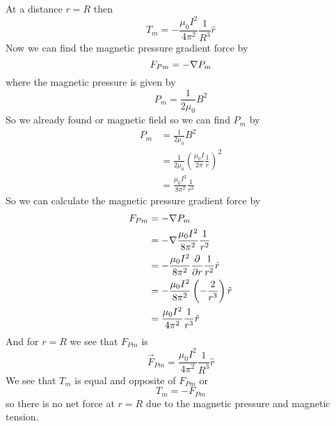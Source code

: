 \documentclass[11pt]{article}
\numberwithin{equation}{section}
\newcommand{\grad}{\bold\nabla}
\begin{document}
At a distance $r=R$ then 
$$T_m = -\frac{\mu_0I^2}{4\pi^2}\frac{1}{R^3} \hat{r}$$
Now we can find the magnetic pressure gradient force by
$$F_{Pm} = -\grad P_m$$
where the magnetic pressure is given by
$$P_m = \frac{1}{2\mu_0}B^2$$
So we already found or magnetic field so we can find $P_m$ by
\begin{align*}
P_m &= \frac{1}{2\mu_0}B^2\\
&= \frac{1}{2\mu_0}\left(\frac{\mu_0 I}{2\pi}\frac{1}{r}\right)^2\\
&= \frac{\mu_0I^2}{8\pi^2}\frac{1}{r^2}
\end{align*}
So we can calculate the magnetic pressure gradient force by
\begin{align*}
F_{Pm} &= -\grad P_m\\
&= -\grad \frac{\mu_0I^2}{8\pi^2}\frac{1}{r^2}\\
&= -\frac{\mu_0I^2}{8\pi^2}\frac{\partial}{\partial r}\frac{1}{r^2}\hat{r}\\
&= -\frac{\mu_0I^2}{8\pi^2}\left(-\frac{2}{r^3}\right)\hat{r}\\
&= \frac{\mu_0I^2}{4\pi^2}\frac{1}{r^3}\hat{r}
\end{align*}
And for $r=R$ we see that $F_{Pm}$ is
$$\vec{F}_{Pm} = \frac{\mu_0I^2}{4\pi^2}\frac{1}{R^3}\hat{r}$$
We see that $T_m$ is equal and opposite of $F_{Pm}$ or
$$T_m = - F_{Pm}$$ 
so there is no net force at $r=R$ due to the magnetic pressure and magnetic tension.
\end{document}
